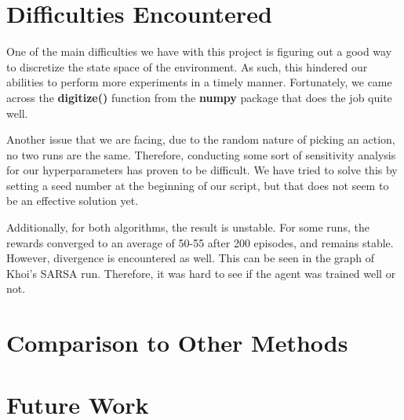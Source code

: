 \documentclass[nohyperref]{article}
\theoremstyle{plain}
\theoremstyle{definition}
\theoremstyle{remark}
\begin{document}
\section{Difficulties Encountered}

One of the main difficulties we have with this project is figuring out a good way to discretize the state space of the environment.
As such, this hindered our abilities to perform more experiments in a timely manner.
Fortunately, we came across the \textbf{digitize()} function from the \textbf{numpy} package that does the job quite well.

Another issue that we are facing, due to the random nature of picking an action, no two runs are the same. Therefore, conducting some sort of
sensitivity analysis for our hyperparameters has proven to be difficult. We have tried to solve this by setting a seed number at the beginning
of our script, but that does not seem to be an effective solution yet.

Additionally, for both algorithms, the result is unstable. For some runs, the rewards converged to an average of 50-55 after 200 episodes, and remains stable. However, divergence is encountered
as well. This can be seen in the graph of Khoi's SARSA run. Therefore, it was hard to see if the agent was trained well or not.

\section{Comparison to Other Methods}

\section{Future Work}


\end{document}

